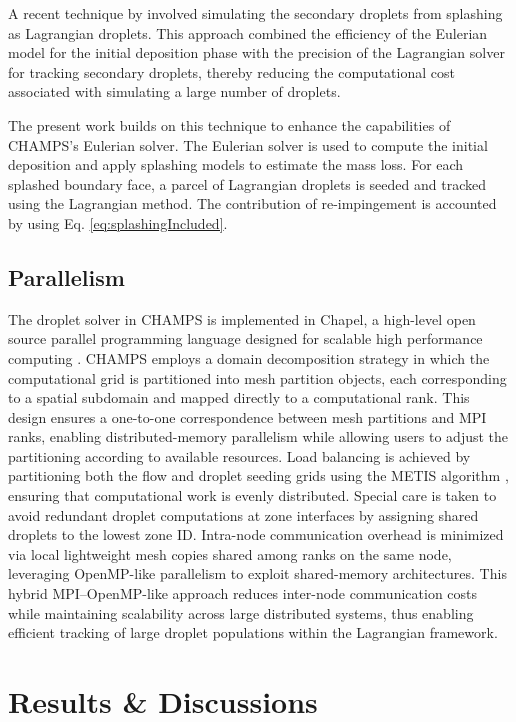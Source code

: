 A recent technique by \cite{bellosta2023lagrangian} involved simulating the secondary droplets from splashing as Lagrangian droplets. This approach combined the efficiency of the Eulerian model for the initial deposition phase with the precision of the Lagrangian solver for tracking secondary droplets, thereby reducing the computational cost associated with simulating a large number of droplets.

The present work builds on this technique to enhance the capabilities of CHAMPS's Eulerian solver. The Eulerian solver is used to compute the initial deposition and apply splashing models to estimate the mass loss. For each splashed boundary face, a parcel of Lagrangian droplets is seeded and tracked using the Lagrangian method. The contribution of re-impingement is accounted by using Eq. \ref{eq:splashingIncluded}.

\subsection{Parallelism}
The droplet solver in CHAMPS is implemented in Chapel, a high-level open source parallel programming language designed for scalable high performance computing \cite{parenteau}. CHAMPS employs a domain decomposition strategy in which the computational grid is partitioned into mesh partition objects, each corresponding to a spatial subdomain and mapped directly to a computational rank. This design ensures a one-to-one correspondence between mesh partitions and MPI ranks, enabling distributed-memory parallelism while allowing users to adjust the partitioning according to available resources. Load balancing is achieved by partitioning both the flow and droplet seeding grids using the METIS algorithm \cite{karypis2003parmetis}, ensuring that computational work is evenly distributed. Special care is taken to avoid redundant droplet computations at zone interfaces by assigning shared droplets to the lowest zone ID. Intra-node communication overhead is minimized via local lightweight mesh copies shared among ranks on the same node, leveraging OpenMP-like parallelism to exploit shared-memory architectures. This hybrid MPI–OpenMP-like approach reduces inter-node communication costs while maintaining scalability across large distributed systems, thus enabling efficient tracking of large droplet populations within the Lagrangian framework.


\section{Results \& Discussions}
\label{sec:Results}

